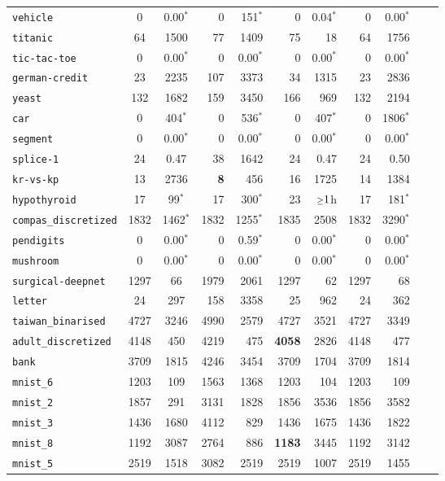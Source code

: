 \begin{tabular}{lccrrrrrrrr}
\texttt{vehicle} & 0 & 0.00$^*$ & 0 & 151$^*$ & 0 & 0.04$^*$ & 0 & 0.00$^*$\\
\texttt{titanic} & 64 & 1500 & 77 & 1409 & 75 & 18 & 64 & 1756\\
\texttt{tic-tac-toe} & 0 & 0.00$^*$ & 0 & 0.00$^*$ & 0 & 0.00$^*$ & 0 & 0.00$^*$\\
\texttt{german-credit} & 23 & 2235 & 107 & 3373 & 34 & 1315 & 23 & 2836\\
\texttt{yeast} & 132 & 1682 & 159 & 3450 & 166 & 969 & 132 & 2194\\
\texttt{car} & 0 & 404$^*$ & 0 & 536$^*$ & 0 & 407$^*$ & 0 & 1806$^*$\\
\texttt{segment} & 0 & 0.00$^*$ & 0 & 0.00$^*$ & 0 & 0.00$^*$ & 0 & 0.00$^*$\\
\texttt{splice-1} & 24 & 0.47 & 38 & 1642 & 24 & 0.47 & 24 & 0.50\\
\texttt{kr-vs-kp} & 13 & 2736 & \textbf{8} & 456 & 16 & 1725 & 14 & 1384\\
\texttt{hypothyroid} & 17 & 99$^*$ & 17 & 300$^*$ & 23 & $\mathsmaller{\geq}1$h & 17 & 181$^*$\\
\texttt{compas\_discretized} & 1832 & 1462$^*$ & 1832 & 1255$^*$ & 1835 & 2508 & 1832 & 3290$^*$\\
\texttt{pendigits} & 0 & 0.00$^*$ & 0 & 0.59$^*$ & 0 & 0.00$^*$ & 0 & 0.00$^*$\\
\texttt{mushroom} & 0 & 0.00$^*$ & 0 & 0.00$^*$ & 0 & 0.00$^*$ & 0 & 0.00$^*$\\
\texttt{surgical-deepnet} & 1297 & 66 & 1979 & 2061 & 1297 & 62 & 1297 & 68\\
\texttt{letter} & 24 & 297 & 158 & 3358 & 25 & 962 & 24 & 362\\
\texttt{taiwan\_binarised} & 4727 & 3246 & 4990 & 2579 & 4727 & 3521 & 4727 & 3349\\
\texttt{adult\_discretized} & 4148 & 450 & 4219 & 475 & \textbf{4058} & 2826 & 4148 & 477\\
\texttt{bank} & 3709 & 1815 & 4246 & 3454 & 3709 & 1704 & 3709 & 1814\\
\texttt{mnist\_6} & 1203 & 109 & 1563 & 1368 & 1203 & 104 & 1203 & 109\\
\texttt{mnist\_2} & 1857 & 291 & 3131 & 1828 & 1856 & 3536 & 1856 & 3582\\
\texttt{mnist\_3} & 1436 & 1680 & 4112 & 829 & 1436 & 1675 & 1436 & 1822\\
\texttt{mnist\_8} & 1192 & 3087 & 2764 & 886 & \textbf{1183} & 3445 & 1192 & 3142\\
\texttt{mnist\_5} & 2519 & 1518 & 3082 & 2519 & 2519 & 1007 & 2519 & 1455\\

\end{tabular}
